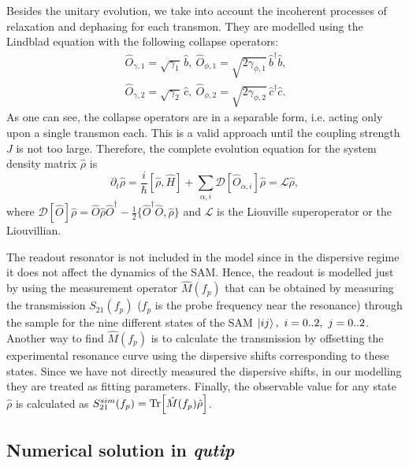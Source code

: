 \documentclass[%
 pra,
 amsmath,amssymb,
 reprint,%
]{revtex4-1}
\begin{document}
Besides the unitary evolution, we take into account the incoherent processes of relaxation and dephasing for each transmon. They are modelled using the Lindblad equation with the following collapse operators:
\begin{equation}\
\begin{split}
\hat{{O}}_{\gamma, 1} = \sqrt{\gamma_1}\, \hat b,\ 
\hat{{O}}_{\phi, 1} = \sqrt{2\gamma_{\phi,1}}\, \hat b^\dag \hat b,\\
\hat{{O}}_{\gamma,2} = \sqrt{\gamma_2}\, \hat c,\ 
\hat{{O}}_{\phi,2} = \sqrt{2\gamma_{ \phi,2}}\, \hat c^\dag \hat c.
\end{split}
\end{equation}
As one can see, the collapse operators are in a separable form, i.e. acting only upon a single transmon each. This is a valid approach until the coupling strength $J$ is not too large\cite{beaudoin2011dissipation}. Therefore, the complete evolution equation for the system density matrix $\hat \rho$ is
\begin{equation}
\partial_t \hat \rho = \frac{i}{\hbar}[\hat \rho, \hat H] + \sum_{\alpha, i} \mathcal{D}[\hat{O}_{\alpha, i}] \hat \rho = \mathcal{L}\hat\rho, \label{eq:master}
\end{equation}
where $\mathcal{D}[\hat{{O}}]\hat \rho = \hat{{O}} \hat \rho \hat{{O}}^\dag - \frac{1}{2}\{ \hat{{O}}^\dag \hat{{O}}, \hat \rho\}$ and $\mathcal{L}$ is the Liouville superoperator or the Liouvillian.


The readout resonator is not included in the model since in the dispersive regime it does not affect the dynamics of the SAM. Hence, the readout is modelled just by using the measurement operator $\hat M(f_p)$ that can be obtained by measuring the transmission $S_{21}(f_p)$ ($f_p$ is the probe frequency near the resonance) through the sample for the nine different states of the SAM $\ket{ij},\ i=0..2,\ j=0..2$\cite{filipp2009two}. Another way to find $\hat M(f_p)$ is to calculate the transmission by offsetting the experimental resonance curve using the dispersive shifts corresponding to these states. Since we have not directly measured the dispersive shifts, in our modelling they are treated as fitting parameters. Finally, the observable value for any state $\hat \rho$ is calculated as $S_{21}^{sim}(f_p) = \Tr[\hat M(f_p) \hat \rho]$.


\subsection{Numerical solution in \textit{qutip}}
\end{document}
